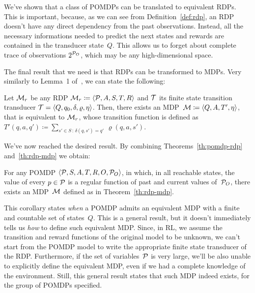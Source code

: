 We've shown that a class of POMDPs can be translated to equivalent RDPs. This
is important, because, as we can see from Definition~\ref{def:rdp}, an RDP
doesn't have any direct dependency from the past observations. Instead, all
the necessary informations needed to predict the next states and rewards are
contained in the transducer state~$Q$. This allows us to forget about complete
trace of observations $2^{\mathcal{P}_O}$, which may be any high-dimensional
space.

The final result that we need is that RDPs can be transformed to MDPs. Very
similarly to Lemma~1 of~\cite{bib:rdp}, we can state the following:
\begin{theorem}
	Let $\mathcal{M}_r$ be any RDP $\mathcal{M}_r \coloneqq \langle \mathcal{P}, A,
	S, T, R \rangle$ and $\mathcal{T}$ its finite state transition transducer
	$\mathcal{T} = \langle Q, q_0, \delta, \varrho, \eta \rangle$. Then, there
	exists an MDP~$\mathcal{M} \coloneqq \langle Q, A, T', \eta \rangle$, that is
	equivalent to $\mathcal{M}_r$, whose transition function is defined as $T'(q,
	a, q') \coloneqq \sum_{s' \in S\,:\, \delta(q, s')=q'}\, \varrho(q, a, s')$.
	\label{th:rdp-mdp}
\end{theorem}

We've now reached the desired result. By combining Theorems~\ref{th:pomdp-rdp}
and~\ref{th:rdp-mdp} we obtain:
\begin{corollary}
	For any POMDP $\langle \mathcal{P}, S, A, T, R, O, \mathcal{P}_O \rangle$, in
	which, in all reachable states, the value of every $p \in \mathcal{P}$ is a
	regular function of past and current values of~$\mathcal{P}_O$, there exists
	an MDP~$\mathcal{M}$ defined as in Theorem~\ref{th:rdp-mdp}.
\end{corollary}

This corollary states \emph{when} a POMDP admits an equivalent MDP with a
finite and countable set of states~$Q$. This is a general result, but it
doesn't immediately tells us \emph{how} to define such equivalent MDP. Since,
in RL, we assume the transition and reward functions of the original model to
be unknown, we can't start from the POMDP model to write the appropriate
finite state transducer of the RDP. Furthermore, if the set of
variables~$\mathcal{P}$ is very large, we'll be also unable to explicitly
define the equivalent MDP, even if we had a complete knowledge of the
environment.  Still, this general result states that such MDP indeed exists,
for the group of POMDPs specified.

